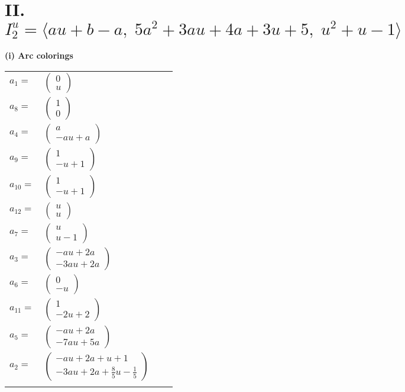 \documentclass[1p]{elsarticle_modified}
\theoremstyle{definition}
\begin{document}
\centering \section*{II. $I^u_{2}= \langle a u+b- a,\;5 a^2+3 a u+4 a+3 u+5,\;u^2+u-1 \rangle$}
\flushleft \textbf{(i) Arc colorings}\\
\begin{tabular}{m{7pt} m{180pt} m{7pt} m{180pt} }
\flushright $a_{1}=$&$\begin{pmatrix}0\\u\end{pmatrix}$ \\
\flushright $a_{8}=$&$\begin{pmatrix}1\\0\end{pmatrix}$ \\
\flushright $a_{4}=$&$\begin{pmatrix}a\\- a u+a\end{pmatrix}$ \\
\flushright $a_{9}=$&$\begin{pmatrix}1\\- u+1\end{pmatrix}$ \\
\flushright $a_{10}=$&$\begin{pmatrix}1\\- u+1\end{pmatrix}$ \\
\flushright $a_{12}=$&$\begin{pmatrix}u\\u\end{pmatrix}$ \\
\flushright $a_{7}=$&$\begin{pmatrix}u\\u-1\end{pmatrix}$ \\
\flushright $a_{3}=$&$\begin{pmatrix}- a u+2 a\\-3 a u+2 a\end{pmatrix}$ \\
\flushright $a_{6}=$&$\begin{pmatrix}0\\- u\end{pmatrix}$ \\
\flushright $a_{11}=$&$\begin{pmatrix}1\\-2 u+2\end{pmatrix}$ \\
\flushright $a_{5}=$&$\begin{pmatrix}- a u+2 a\\-7 a u+5 a\end{pmatrix}$ \\
\flushright $a_{2}=$&$\begin{pmatrix}- a u+2 a+u+1\\-3 a u+2 a+\frac{8}{5} u-\frac{1}{5}\end{pmatrix}$\\&\end{tabular}
\end{document}

